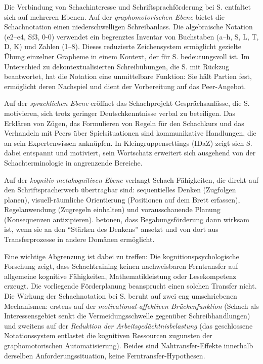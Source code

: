 \documentclass[ngerman, a4paper]{article}
\begin{document}
Die Verbindung von Schachinteresse und Schriftsprachförderung bei S. entfaltet sich
auf mehreren Ebenen. Auf der \textit{graphomotorischen Ebene} bietet die Schachnotation
einen niederschwelligen Schreibanlass. Die algebraische Notation (e2--e4, Sf3, 0-0)
verwendet ein begrenztes Inventar von Buchstaben (a--h, S, L, T, D, K) und Zahlen
(1--8). Dieses reduzierte Zeichensystem ermöglicht gezielte Übung einzelner Grapheme
in einem Kontext, der für S. bedeutungsvoll ist. Im Unterschied zu dekontextualisierten
Schreibübungen, die S. mit Rückzug beantwortet, hat die Notation eine unmittelbare
Funktion: Sie hält Partien fest, ermöglicht deren Nachspiel und dient der Vorbereitung
auf das Peer-Angebot.

Auf der \textit{sprachlichen Ebene} eröffnet das Schachprojekt Gesprächsanlässe, die
S. motivieren, sich trotz geringer Deutschkenntnisse verbal zu beteiligen. Das
Erklären von Zügen, das Formulieren von Regeln für den Schachkurs und das
Verhandeln mit Peers über Spielsituationen sind kommunikative Handlungen, die an
sein Expertenwissen anknüpfen. In Kleingruppensettings (IDaZ) zeigt sich S. dabei
entspannt und motiviert, sein Wortschatz erweitert sich ausgehend von der
Schachterminologie in angrenzende Bereiche.

Auf der \textit{kognitiv-metakognitiven Ebene} verlangt Schach Fähigkeiten, die
direkt auf den Schriftspracherwerb übertragbar sind: sequentielles Denken
(Zugfolgen planen), visuell-räumliche Orientierung (Positionen auf dem Brett
erfassen), Regelanwendung (Zugregeln einhalten) und vorausschauende Planung
(Konsequenzen antizipieren). \textcite{muelleroppliger2021handbuch} betonen, dass
Begabungsförderung dann wirksam ist, wenn sie an den
\enquote{Stärken des Denkens} ansetzt und von dort aus Transferprozesse
in andere Domänen ermöglicht.

Eine wichtige Abgrenzung ist dabei zu treffen: Die kognitionspsychologische
Forschung zeigt, dass Schachtraining keinen nachweisbaren Ferntransfer
auf allgemeine kognitive Fähigkeiten, Mathematikleistung oder
Lesekompetenz erzeugt. Die vorliegende Förderplanung beansprucht
einen solchen Transfer nicht. Die Wirkung der Schachnotation bei S.
beruht auf zwei eng umschriebenen Mechanismen: erstens auf der
\textit{motivational-affektiven Brückenfunktion} (Schach als
Interessensgebiet senkt die Vermeidungsschwelle gegenüber
Schreibhandlungen) und zweitens auf der \textit{Reduktion der
Arbeitsgedächtnisbelastung} (das geschlossene Notationssystem entlastet
die kognitiven Ressourcen zugunsten der graphomotorischen Automatisierung).
Beides sind Nahtransfer-Effekte innerhalb derselben Anforderungssituation,
keine Ferntransfer-Hypothesen.
\end{document}
